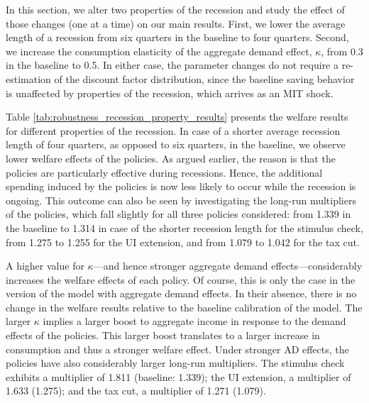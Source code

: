 \documentclass[\econtexRoot/HAFiscal]{subfiles}
\begin{document}
In this section, we alter two properties of the recession and study the effect of those changes (one at a time) on our main results. First, we lower the average length of a recession from six quarters in the baseline to four quarters. Second, we increase the consumption elasticity of the aggregate demand effect, $\kappa$, from 0.3 in the baseline to 0.5. In either case, the parameter changes do not require a re-estimation of the discount factor distribution, since the baseline saving behavior is unaffected by properties of the recession, which arrives as an MIT shock. 

Table \ref{tab:robustness_recession_property_results} presents the welfare results for different properties of the recession. In case of a shorter average recession length of four quarters, as opposed to six quarters, in the baseline, we observe lower welfare effects of the policies. As argued earlier, the reason is that the policies are particularly effective during recessions. Hence, the additional spending induced by the policies is now less likely to occur while the recession is ongoing. This outcome can also be seen by investigating the long-run multipliers of the policies, which fall slightly for all three policies considered: from 1.339 in the baseline to 1.314 in case of the shorter recession length for the stimulus check, from 1.275 to 1.255 for the UI extension, and from 1.079 to 1.042 for the tax cut.

A higher value for $\kappa$---and hence stronger aggregate demand effects---considerably increases the welfare effects of each policy. Of course, this is only the case in the version of the model with aggregate demand effects. In their absence, there is no change in the welfare results relative to the baseline calibration of the model. The larger $\kappa$ implies a larger boost to aggregate income in response to the demand effects of the policies. This larger boost translates to a larger increase in consumption and thus a stronger welfare effect. Under stronger AD effects, the policies have also considerably larger long-run multipliers. The stimulus check exhibits a multiplier of 1.811 (baseline: 1.339); the UI extension, a multiplier of 1.633 (1.275); and the tax cut, a multiplier of 1.271 (1.079).
\end{document}
